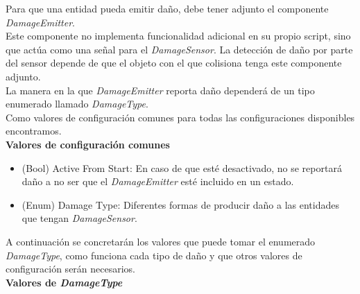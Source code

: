 Para que una entidad pueda emitir daño, debe tener adjunto el componente \textit{DamageEmitter}.\\
Este componente no implementa funcionalidad adicional en su propio script, sino que actúa como una señal para el \textit{DamageSensor}. La detección de daño por parte del sensor depende de que el objeto con el que colisiona tenga este componente adjunto.\\

La manera en la que \textit{DamageEmitter} reporta daño dependerá de un tipo enumerado llamado \textit{DamageType}.\\
Como valores de configuración comunes para todas las configuraciones disponibles encontramos.\\

\textbf{Valores de configuración comunes}
\begin{itemize}
	\item (Bool) Active From Start: En caso de que esté desactivado, no se reportará daño a no ser que el \textit{DamageEmitter} esté incluido en un estado.
	\item (Enum) Damage Type: Diferentes formas de producir daño a las entidades que tengan \textit{DamageSensor}.
\end{itemize}

A continuación se concretarán los valores que puede tomar el enumerado \textit{DamageType}, como funciona cada tipo de daño y que otros valores de configuración serán necesarios.\\

\textbf{Valores de \textit{DamageType}}

